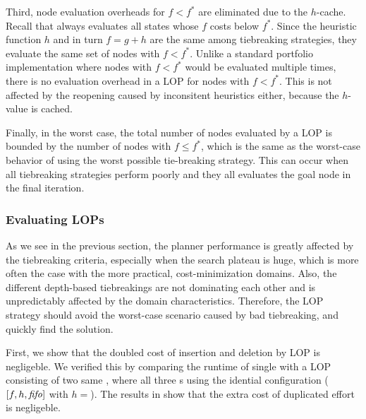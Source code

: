 Third, node evaluation overheads for $f < f^*$ are eliminated due to the $h$-cache.
Recall that \astar always evaluates all states whose $f$ costs 
below $f^*$. Since the heuristic function $h$ and in turn $f=g+h$ are
the same among tiebreaking strategies, they evaluate the same set of
nodes with $f<f^*$. Unlike a standard portfolio implementation where 
nodes with $f<f^*$ would be evaluated multiple times, there is no evaluation overhead in a LOP
for nodes with $f<f^*$.
This is not
affected by the reopening caused by inconsitent heuristics either,
because the $h$-value is cached.


Finally, in the worst case, the total number of nodes evaluated by a LOP is bounded by the number of nodes with $f \leq f^*$, which is the same as the worst-case behavior of \astar using the worst possible tie-breaking strategy.
This can occur  when all tiebreaking
strategies perform poorly  and they all evaluates the goal node in the
final iteration.

\subsubsection{Evaluating LOPs}

As we see in the previous section, the planner performance is greatly
affected by the tiebreaking criteria, especially when the search plateau
is huge, which is more often the case with the more practical,
cost-minimization domains.
% 
Also, the different depth-based tiebreakings are not dominating
each other and is unpredictably affected by the domain characteristics.
% 
Therefore, the LOP strategy should avoid the
worst-case scenario caused by bad tiebreaking, and quickly find the solution.

First, we show that the doubled cost of insertion and deletion by LOP is
negligeble.  We verified this by comparing the runtime of single \astar
with a LOP consisting of two same \astar, where all three \astar{}s
using the idential configuration ($[f,h,\mbox{\textit{fifo}}]$ with $h=$\lmcut). The
results in  show that the extra cost of duplicated effort
is negligeble.

